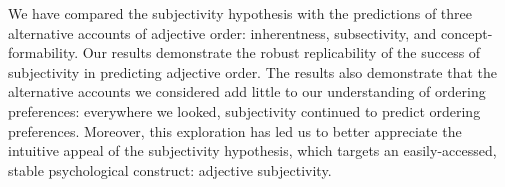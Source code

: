 \documentclass[12pt]{article}
\newcommand{\jd}[1]{\textcolor{red}{[jd: #1]}}
\begin{document}
We have compared the subjectivity hypothesis with the predictions of three alternative accounts of adjective order: inherentness, subsectivity, and concept-formability. Our results demonstrate the robust replicability of the success of subjectivity in predicting adjective order. The results also demonstrate that the alternative accounts we considered add little to our understanding of ordering preferences: everywhere we looked, subjectivity continued to predict ordering preferences. %
Moreover, this exploration has led us to better appreciate the intuitive appeal of the subjectivity hypothesis, which targets an easily-accessed, stable psychological construct: adjective subjectivity.





 

\end{document}
